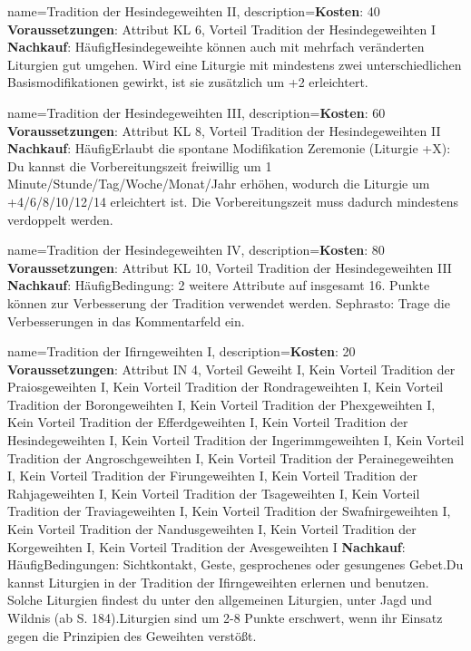 {
    name={Tradition der Hesindegeweihten II},
    description={\textbf{Kosten}: 40 \textbf{Voraussetzungen}: Attribut KL 6, Vorteil Tradition der Hesindegeweihten I \textbf{Nachkauf}: Häufig\newline Hesindegeweihte können auch mit mehrfach veränderten Liturgien gut umgehen. Wird eine Liturgie mit mindestens zwei unterschiedlichen Basismodifikationen gewirkt, ist sie zusätzlich um +2 erleichtert.}
}


{
    name={Tradition der Hesindegeweihten III},
    description={\textbf{Kosten}: 60 \textbf{Voraussetzungen}: Attribut KL 8, Vorteil Tradition der Hesindegeweihten II \textbf{Nachkauf}: Häufig\newline Erlaubt die spontane Modifikation Zeremonie (Liturgie +X): Du kannst die Vorbereitungszeit freiwillig um 1 Minute/Stunde/Tag/Woche/Monat/Jahr erhöhen, wodurch die Liturgie um +4/6/8/10/12/14 erleichtert ist. Die Vorbereitungszeit muss dadurch mindestens verdoppelt werden.}
}


{
    name={Tradition der Hesindegeweihten IV},
    description={\textbf{Kosten}: 80 \textbf{Voraussetzungen}: Attribut KL 10, Vorteil Tradition der Hesindegeweihten III \textbf{Nachkauf}: Häufig\newline Bedingung: 2 weitere Attribute auf insgesamt 16. Punkte können zur Verbesserung der Tradition verwendet werden. Sephrasto: Trage die Verbesserungen in das Kommentarfeld ein.}
}


{
    name={Tradition der Ifirngeweihten I},
    description={\textbf{Kosten}: 20 \textbf{Voraussetzungen}: Attribut IN 4, Vorteil Geweiht I, Kein Vorteil Tradition der Praiosgeweihten I, Kein Vorteil Tradition der Rondrageweihten I, Kein Vorteil Tradition der Borongeweihten I, Kein Vorteil Tradition der Phexgeweihten I, Kein Vorteil Tradition der Efferdgeweihten I, Kein Vorteil Tradition der Hesindegeweihten I, Kein Vorteil Tradition der Ingerimmgeweihten I, Kein Vorteil Tradition der Angroschgeweihten I, Kein Vorteil Tradition der Perainegeweihten I, Kein Vorteil Tradition der Firungeweihten I, Kein Vorteil Tradition der Rahjageweihten I, Kein Vorteil Tradition der Tsageweihten I, Kein Vorteil Tradition der Traviageweihten I, Kein Vorteil Tradition der Swafnirgeweihten I, Kein Vorteil Tradition der Nandusgeweihten I, Kein Vorteil Tradition der Korgeweihten I, Kein Vorteil Tradition der Avesgeweihten I \textbf{Nachkauf}: Häufig\newline Bedingungen: Sichtkontakt, Geste, gesprochenes oder gesungenes Gebet.\newline Du kannst Liturgien in der Tradition der Ifirngeweihten erlernen und benutzen. Solche Liturgien findest du unter den allgemeinen Liturgien, unter Jagd und Wildnis (ab S. 184).\newline Liturgien sind um 2-8 Punkte erschwert, wenn ihr Einsatz gegen die Prinzipien des Geweihten verstößt.}
}


